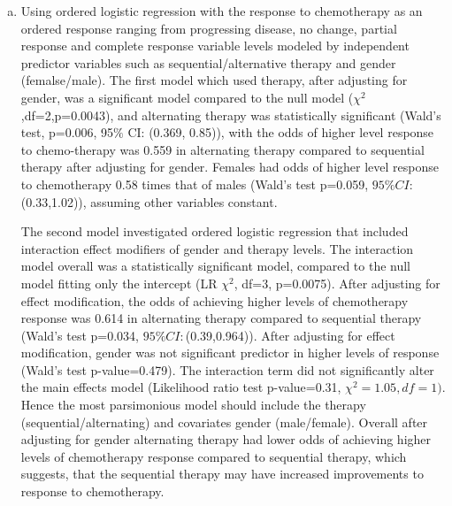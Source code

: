 \documentclass{article}
\begin{document}
\begin{enumerate}[a.]
\item  Using ordered logistic regression  with the response to chemotherapy as an ordered response ranging from progressing disease, no change, partial response and complete response variable levels modeled by independent predictor variables such as sequential/alternative therapy and gender (femalse/male).  The first model which used therapy, after adjusting for gender, was a significant model compared to the null model ($\chi^{2}$,df=2,p=0.0043), and alternating therapy was statistically significant (Wald's test, p=0.006, 95$\%$ CI: (0.369, 0.85)), with the odds of higher level response to chemo-therapy was 0.559 in alternating therapy compared to sequential therapy after adjusting for gender.  Females had odds of higher level response to chemotherapy 0.58 times that of males (Wald's test p=0.059, $95\% CI:$(0.33,1.02)), assuming other variables constant. \par
  The second model investigated ordered logistic regression that included interaction effect modifiers of gender and therapy levels.  The interaction model overall was a statistically significant model, compared to the null model fitting only the intercept (LR $\chi^{2}$, df=3, p=0.0075).  After adjusting for effect modification,  the odds of achieving higher levels of chemotherapy response was 0.614 in alternating therapy compared to sequential therapy (Wald's test p=0.034, $95\% CI:$(0.39,0.964)).  After adjusting for effect modification, gender was not significant predictor in higher levels of response (Wald's test p-value=0.479).  The interaction term did not significantly alter the main effects model (Likelihood ratio test p-value=0.31, $\chi^{2}=1.05, df=1)$.  Hence the most parsimonious model should include the therapy (sequential/alternating) and covariates gender (male/female).   Overall after adjusting for gender alternating therapy had lower odds of achieving higher levels of chemotherapy response compared to sequential therapy, which suggests, that the sequential therapy may have increased improvements to response to chemotherapy.  
\end{enumerate}
\end{document}
